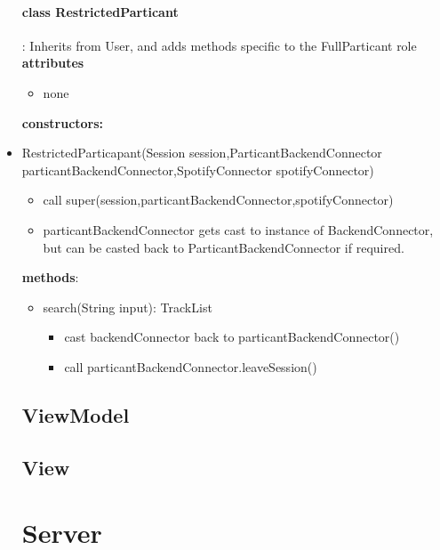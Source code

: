 \documentclass[oneside, nenglish]{sdqtechreport}
\begin{document}
\begin{itemize}
\subsubsection{class RestrictedParticant}:
Inherits from User, and adds methods specific to the FullParticant role 
\textbf{attributes}
\begin{itemize}
    \item none
\end{itemize}
\textbf{constructors:}
\item RestrictedParticapant(Session session,ParticantBackendConnector particantBackendConnector,SpotifyConnector spotifyConnector) 
\begin{itemize}
    \item call super(session,particantBackendConnector,spotifyConnector)
    \item particantBackendConnector gets cast to instance of BackendConnector, but can be casted back to ParticantBackendConnector if required.
\end{itemize}
\textbf{methods}:
\begin{itemize}
    \item search(String input): TrackList
    \begin{itemize}
        \item cast backendConnector back to particantBackendConnector()
        \item call particantBackendConnector.leaveSession()
    \end{itemize}
\end{itemize}


















\section{ViewModel}
\label{sec:App:ViewModel}

\section{View}
\label{sec:App:View}

\chapter{Server}
\label{chap:Server}


\end{itemize}
\end{document}

